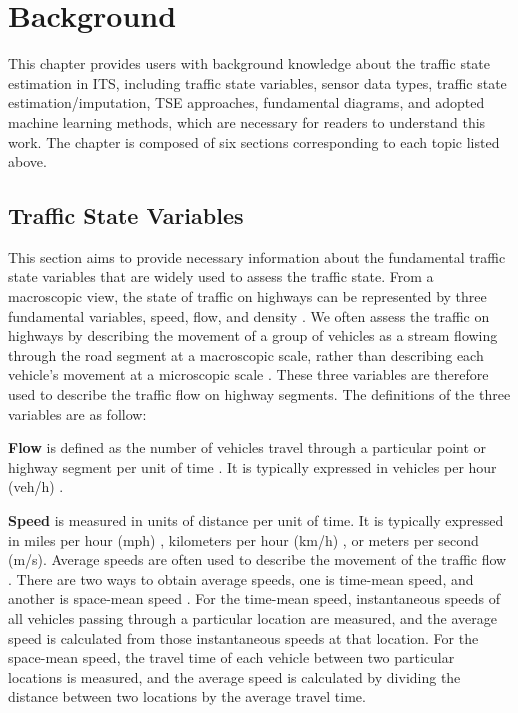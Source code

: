 \documentclass[english]{kththesis}
\begin{document}
\cleardoublepage
\chapter{Background}
\label{ch:background}
This chapter provides users with background knowledge about the traffic state estimation in ITS, including traffic state variables, sensor data types, traffic state estimation/imputation, TSE approaches, fundamental diagrams, and adopted machine learning methods, which are necessary for readers to understand this work. The chapter is composed of six sections corresponding to each topic listed above.

\section{Traffic State Variables}
This section aims to provide necessary information about the fundamental traffic state variables that are widely used to assess the traffic state. From a macroscopic view, the state of traffic on highways can be represented by three fundamental variables, speed, flow, and density \cite{seo_tse, elefteriadou_traffic_flow_theory}. We often assess the traffic on highways by describing the movement of a group of vehicles as a stream flowing through the road segment at a macroscopic scale, rather than describing each vehicle's movement at a microscopic scale \cite{elefteriadou_traffic_flow_theory}. These three variables are therefore used to describe the traffic flow on highway segments. The definitions of the three variables are as follow:

\textbf{Flow} is defined as the number of vehicles travel through a particular point or highway segment per unit of time \cite{elefteriadou_traffic_flow_theory}. It is typically expressed in vehicles per hour (veh/h) \cite{seo_tse, elefteriadou_traffic_flow_theory}.

\textbf{Speed} is measured in units of distance per unit of time. It is typically expressed in miles per hour (mph) \cite{elefteriadou_traffic_flow_theory}, kilometers per hour (km/h) \cite{seo_tse}, or meters per second (m/s). Average speeds are often used to describe the movement of the traffic flow \cite{seo_tse, elefteriadou_traffic_flow_theory}. There are two ways to obtain average speeds, one is time-mean speed, and another is space-mean speed \cite{elefteriadou_traffic_flow_theory}. For the time-mean speed, instantaneous speeds of all vehicles passing through a particular location are measured, and the average speed is calculated from those instantaneous speeds at that location. For the space-mean speed, the travel time of each vehicle between two particular locations is measured, and the average speed is calculated by dividing the distance between two locations by the average travel time.
\end{document}
